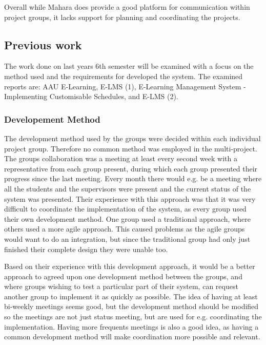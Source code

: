 \documentclass[a4paper,10pt]{article}
\begin{document}
Overall while Mahara does provide a good platform for communication within project groups, it lacks support for planning and coordinating the projects.

\subsection{Previous work}
The work done on last years 6th semester will be examined with a focus on the method used and the requirements for developed the system. The examined reports are: AAU E-Learning, E-LMS (1), E-Learning Management System - Implementing Customisable Schedules, and E-LMS (2).

\subsubsection{Developement Method}
The development method used by the groups were decided within each individual project group. Therefore no common method was employed in the multi-project.
The groups collaboration was a meeting at least every second week with a representative from each group present, during which each group presented their progress since the last meeting.
Every month there would	e.g. be a meeting where all the students and the supervisors were present and the current status of the system was presented.
Their experience with this approach was that it was very difficult to coordinate the implementation of the system, as every group used their own development method. One group used a traditional approach, where others used a more agile approach.
This caused problems as the agile groups would want to do an integration, but since the traditional group had only just finished their complete design they were unable too.

Based on their experience with this development approach, it would be a better approach to agreed upon one development method between the groups, and where groups wishing to test a particular part of their system, can request another group to implement it as quickly as possible.
The idea of having at least bi-weekly meetings seems good, but the development method should be modified so the meetings are not just status meeting, but are used for e.g. coordinating the implementation.
Having more frequents meetings is also a good idea, as having a common development method will make coordination more possible and relevant.

\end{document}
